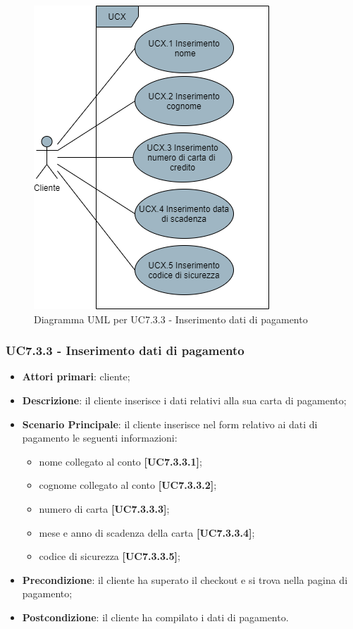\begin{figure}[H]
\centering
\includegraphics[scale=0.6]{res/UseCase/Immagini/InserimentoDatiPagamento}
\caption{Diagramma UML per UC7.3.3 - Inserimento dati di pagamento}
\end{figure}

\subsubsection{UC7.3.3 - Inserimento dati di pagamento}
\begin{itemize}
\item \textbf{Attori primari}: cliente;
\item \textbf{Descrizione}: il cliente inserisce i dati relativi alla sua carta di pagamento;
\item \textbf{Scenario Principale}: il cliente inserisce nel form relativo ai dati di pagamento le seguenti informazioni:
\begin{itemize}
	\item nome collegato al conto \textbf{[UC7.3.3.1]};
	\item cognome collegato al conto \textbf{[UC7.3.3.2]};
	\item numero di carta \textbf{[UC7.3.3.3]};
	\item mese e anno di scadenza della carta \textbf{[UC7.3.3.4]};
	\item codice di sicurezza \textbf{[UC7.3.3.5]};
\end{itemize}
\item \textbf{Precondizione}: il cliente ha superato il checkout e si trova nella pagina di pagamento;
\item \textbf{Postcondizione}: il cliente ha compilato i dati di pagamento.
\end{itemize}

